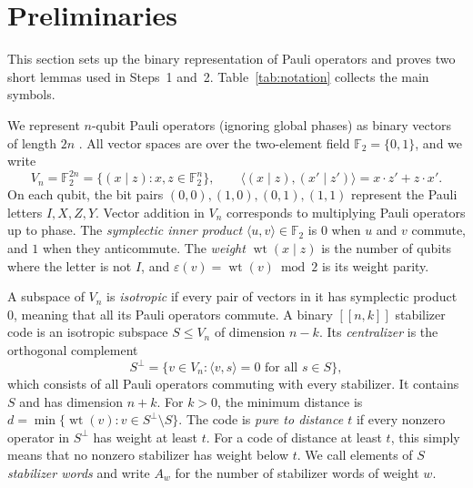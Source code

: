 \documentclass[11pt]{article}
\theoremstyle{definition}
\theoremstyle{remark}
\newcommand{\F}{\mathbb F_2}
\newcommand{\qc}[1]{[\![#1]\!]}
\newcommand{\wt}{\operatorname{wt}}
\begin{document}
\section{Preliminaries}\label{sec:prelim}

This section sets up the binary representation of Pauli operators and
proves two short lemmas used in Steps~1 and~2.
Table~\ref{tab:notation} collects the main symbols.

We represent \(n\)-qubit Pauli operators (ignoring global phases) as
binary vectors of length \(2n\) \cite{crss}. All vector spaces are over
the two-element field \(\F=\{0,1\}\), and we write
\[
 V_n=\F^{2n}=\{(x\mid z):x,z\in\F^n\},\qquad
 \langle (x\mid z),(x'\mid z')\rangle=x\cdot z'+z\cdot x'.
\]
On each qubit, the bit pairs \((0,0),(1,0),(0,1),(1,1)\) represent the
Pauli letters \(I,X,Z,Y\). Vector addition in \(V_n\) corresponds to
multiplying Pauli operators up to phase. The \emph{symplectic inner
product} \(\langle u,v\rangle\in\F\) is \(0\) when \(u\) and \(v\)
commute, and \(1\) when they anticommute. The \emph{weight} \(\wt(x\mid
z)\) is the number of qubits where the letter is not \(I\), and
\(\varepsilon(v)=\wt(v)\bmod 2\) is its weight parity.

A subspace of \(V_n\) is \emph{isotropic} if every pair of vectors in it
has symplectic product \(0\), meaning that all its Pauli operators
commute. A binary \(\qc{n,k}\) stabilizer code is an isotropic subspace
\(S\leq V_n\) of dimension \(n-k\). Its \emph{centralizer} is the
orthogonal complement
\[
 S^\perp = \{v\in V_n : \langle v,s\rangle = 0\text{ for all }s\in S\},
\]
which consists of all Pauli operators commuting with every stabilizer.
It contains \(S\) and has dimension \(n+k\). For \(k>0\), the minimum
distance is \(d=\min\{\wt(v):v\in S^\perp\setminus S\}\). The code is
\emph{pure to distance \(t\)} if every nonzero operator in
\(S^\perp\) has weight at least \(t\). For a code of distance at least
\(t\), this simply means that no nonzero stabilizer has weight below
\(t\). We call elements of \(S\) \emph{stabilizer words} and write
\(A_w\) for the number of stabilizer words of weight \(w\).
\end{document}

